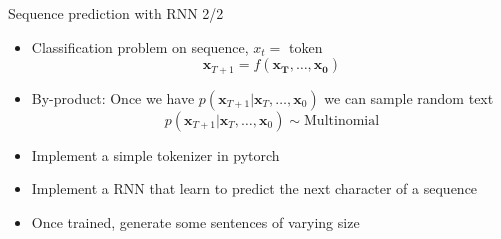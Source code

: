 \documentclass[pressentation,10pt,aspectratio=169,xcolor=table, colorlinks=true]{beamer}
\begin{document}
\begin{frame}{Sequence prediction with RNN 2/2}
  \begin{itemize}
  \item Classification problem on sequence, \(x_t=\) token
    \[\mathbf{x}_{T+1} = f(\mathbf{\mathbf{x}_T, \ldots, \mathbf{x}_0})\]
  \item By-product: Once we have \(p(\mathbf{x}_{T+1}|\mathbf{x}_T, \ldots,\mathbf{x}_0)\) we can sample random text
    \[p(\mathbf{x}_{T+1}|\mathbf{x}_T, \ldots,\mathbf{x}_0) \sim \text{Multinomial}\]
  \end{itemize}

  \begin{work}
    \begin{itemize}
    \item Implement a simple tokenizer in pytorch
    \item Implement a RNN that learn to predict the next character of a sequence
    \item Once trained, generate some sentences of varying size
    \end{itemize}
  \end{work}
  
\end{frame}


\begin{frame}[noframenumbering]{}
  \begin{center}
    \small
    \doclicenseLongText
    \vspace{1cm}
    
    \doclicenseImage
  \end{center}
\end{frame}
\end{document}
